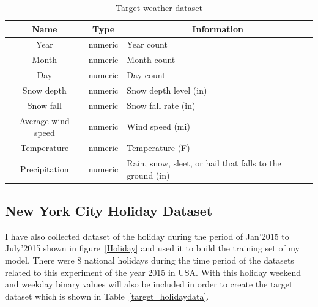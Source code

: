 \begin{table}[]
\centering
\caption{Target weather dataset}
\label{target_weatherdata}
\begin{tabular}{||c||l|l||}
\hline
Name               & \multicolumn{1}{c|}{Type} & \multicolumn{1}{c||}{Information}                         \\ \hline\hline
Year               & numeric                   & Year count                                               \\ \hline
Month              & numeric                   & Month count                                              \\ \hline
Day                & numeric                   & Day count                                                \\ \hline
Snow depth         & numeric                   & Snow depth level (in)                                    \\ \hline
Snow fall          & numeric                   & Snow fall rate (in)                                      \\ \hline
Average wind speed & numeric                   & Wind speed (mi)                                          \\ \hline
Temperature       & numeric                   & Temperature (F)                                          \\ \hline
Precipitation      & numeric                   & Rain, snow, sleet, or hail that falls to the ground (in) \\ \hline
\end{tabular}
\end{table}



\subsection {New York City Holiday Dataset}
\label{NYCholidaydata}


I have also collected dataset of the holiday during the period of Jan'2015 to July'2015 shown in figure~\ref{Holiday} and used it to build the training set of my model. There were 8 national holidays during the time period of the datasets related to this experiment of the year 2015 in USA. With this holiday weekend and weekday binary values will also be included in order to create the target dataset which is shown in 
Table~\ref{target_holidaydata}.  


